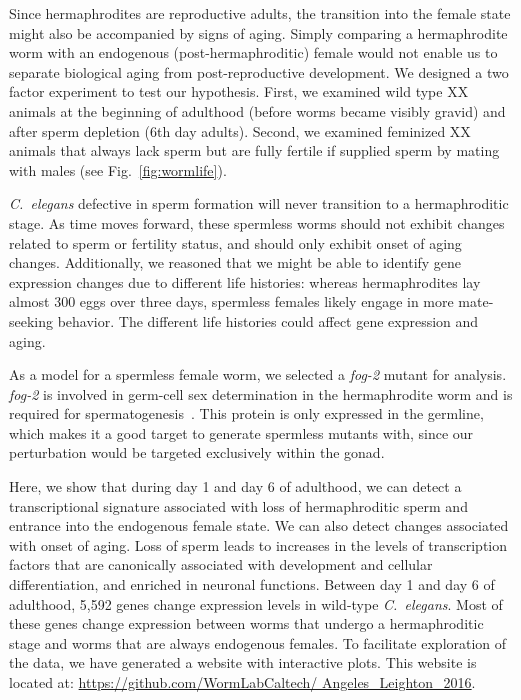 \documentclass[9pt,twocolumn,twoside]{gsag3jnl}
\newcommand{\cel}{\emph{C.~elegans}}
\newcommand{\fog}{\emph{fog-2}}
\newcommand{\agen}{5,592}
\begin{document}
Since hermaphrodites are reproductive adults, the transition into the female state might also be accompanied by signs of aging. Simply comparing a hermaphrodite worm with an endogenous (post-hermaphroditic) female would not enable us to separate biological aging from post-reproductive development. We designed a two factor experiment to test our hypothesis. First, we examined wild type XX animals at the beginning of adulthood (before worms became visibly gravid) and after sperm depletion (6th day adults). Second, we examined feminized XX animals that always lack sperm but are fully fertile if supplied sperm by mating with males (see Fig.~\ref{fig:wormlife}).

\cel{} defective in sperm formation will never transition to a hermaphroditic stage. As time moves forward, these spermless worms should not exhibit changes related to sperm or fertility status, and should only exhibit onset of aging changes. Additionally, we reasoned that we might be able to identify gene expression changes due to different life histories: whereas hermaphrodites lay almost 300 eggs over three days, spermless females likely engage in more mate-seeking behavior. The different life histories could affect gene expression and aging.

As a model for a spermless female worm, we selected a \fog{} mutant for analysis. \fog{} is involved in germ-cell sex determination in the hermaphrodite worm and is required for spermatogenesis~\citep{Schedl1988,Clifford2000}. This protein is only expressed in the germline, which makes it a good target to generate spermless mutants with, since our perturbation would be targeted exclusively within the gonad.

Here, we show that during day 1 and day 6 of adulthood, we can detect a transcriptional signature associated with loss of hermaphroditic sperm and entrance into the endogenous female state. We can also detect changes associated with onset of aging. Loss of sperm leads to increases in the levels of transcription factors that are canonically associated with development and cellular differentiation, and enriched in neuronal functions.
Between day 1 and day 6 of adulthood, \agen{} genes change expression levels in wild-type \cel{}. Most of these genes change expression between worms that undergo a hermaphroditic stage and worms that are always endogenous females. To facilitate exploration of the data, we have generated a website with interactive plots. This website is located at: \url{https://github.com/WormLabCaltech/ Angeles_Leighton_2016}.
\end{document}

